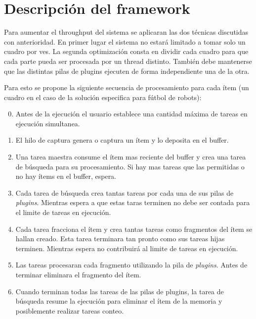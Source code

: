 
\section{Descripción del framework}

Para aumentar el throughput del sistema se aplicaran las dos técnicas discutidas
con anterioridad. En primer lugar el sistema no estará limitado a tomar solo un
cuadro por ves. La segunda optimización consta en dividir cada cuadro para que
cada parte pueda ser procesada por un thread distinto. También debe mantenerse
que las distintas pilas de plugins ejecuten de forma independiente una de la
otra.

Para esto se propone la siguiente secuencia de procesamiento para cada ítem (un
cuadro en el caso de la solución especifica para fútbol de robots):

\begin{enumerate}

\setcounter{enumi}{-1}

\item	Antes de la ejecución el usuario establece una cantidad máxima de tareas
	en ejecución simultanea.

\item	El hilo de captura genera o captura un ítem y lo deposita en el buffer.

\item	Una tarea maestra consume el ítem mas reciente del buffer y crea una
	tarea de búsqueda para su procesamiento. Si hay mas tareas que las
	permitidas o no hay ítems en el buffer, espera.

\item	Cada tarea de búsqueda crea tantas tareas por cada una de sus pilas de
	\emph{plugins}. Mientras espera a que estas taras terminen no debe ser
	contada para el limite de tareas en ejecución.

\item	Cada tarea fracciona el ítem y crea tantas tareas como fragmentos del
	ítem se hallan creado. Esta tarea terminara tan pronto como sus tareas
	hijas terminen. Mientras espera no contribuirá al limite de tareas en
	ejecución.

\item	Las tareas procesaran cada fragmento utilizando la pila de
	\emph{plugins}. Antes de terminar eliminara el fragmento del ítem.

\item	Cuando terminan todas las tareas de las pilas de plugins, la tarea de
	búsqueda resume la ejecución para eliminar el ítem de la memoria y
	posiblemente realizar tareas conteo.

\end{enumerate}

